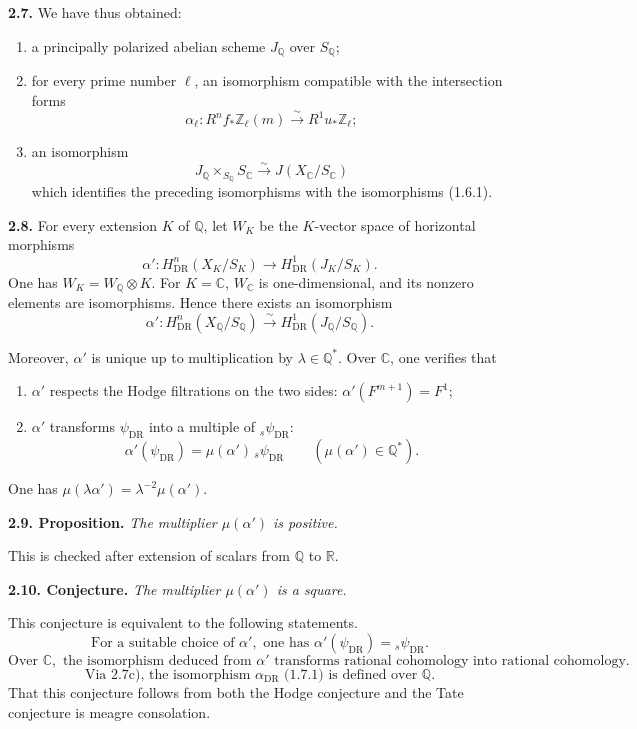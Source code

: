 \documentclass[10pt]{article}
\newcommand{\C}{\mathbb C}
\newcommand{\Q}{\mathbb Q}
\newcommand{\Z}{\mathbb Z}
\newcommand{\DR}{\mathrm{DR}}
\newcommand{\R}{\mathbb R}
\newcommand{\iso}{\xrightarrow{\sim}}
\newcommand{\sourcebreak}{\clearpage}
\begin{document}
\noindent\textbf{2.7.} We have thus obtained:
\begin{enumerate}[label=\alph*)]
\item a principally polarized abelian scheme \(J_\Q\) over \(S_\Q\);
\item for every prime number \(\ell\), an isomorphism compatible with the intersection forms
\[
\alpha_\ell:R^nf_*\Z_\ell(m)\iso R^1u_*\Z_\ell;
\]
\item an isomorphism
\[
J_\Q\times_{S_\Q}S_\C\iso J(X_\C/S_\C)
\]
which identifies the preceding isomorphisms with the isomorphisms (1.6.1).
\end{enumerate}

\noindent\textbf{2.8.} For every extension \(K\) of \(\Q\), let \(W_K\) be the \(K\)-vector space of horizontal morphisms
\[
\alpha':H^n_{\DR}(X_K/S_K)\longrightarrow H^1_{\DR}(J_K/S_K).
\]
One has \(W_K=W_\Q\otimes K\). For \(K=\C\), \(W_\C\) is one-dimensional, and its nonzero elements are isomorphisms. Hence there exists an isomorphism
\[
\alpha':H^n_{\DR}(X_\Q/S_\Q)\iso H^1_{\DR}(J_\Q/S_\Q).
\]

\sourcebreak
Moreover, \(\alpha'\) is unique up to multiplication by \(\lambda\in\Q^*\). Over \(\C\), one verifies that
\begin{enumerate}[label=\alph*)]
\item \(\alpha'\) respects the Hodge filtrations on the two sides: \(\alpha'(F^{m+1})=F^1\);
\item \(\alpha'\) transforms \(\psi_{\DR}\) into a multiple of \({}_s\psi_{\DR}\):
\[
\alpha'(\psi_{\DR})=\mu(\alpha')\,{}_s\psi_{\DR}\qquad(\mu(\alpha')\in\Q^*).
\]
\end{enumerate}
One has \(\mu(\lambda\alpha')=\lambda^{-2}\mu(\alpha')\).

\noindent\textbf{2.9. Proposition.} \emph{The multiplier \(\mu(\alpha')\) is positive.}

This is checked after extension of scalars from \(\Q\) to \(\R\).

\noindent\textbf{2.10. Conjecture.} \emph{The multiplier \(\mu(\alpha')\) is a square.}

This conjecture is equivalent to the following statements.
\[
\tag{2.10.1}
\text{For a suitable choice of }\alpha',\text{ one has }\alpha'(\psi_{\DR})={}_s\psi_{\DR}.
\]
\[
\tag{2.10.2}
\text{Over }\C,\text{ the isomorphism deduced from }\alpha'\text{ transforms rational cohomology into rational cohomology.}
\]
\[
\tag{2.10.3}
\text{Via 2.7c), the isomorphism }\alpha_{\DR}\text{ (1.7.1) is defined over }\Q.
\]
That this conjecture follows from both the Hodge conjecture and the Tate conjecture is meagre consolation.
\end{document}
